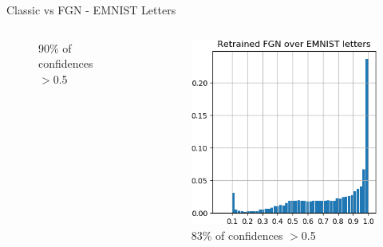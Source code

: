\documentclass{beamer}
\begin{document}
\begin{frame}{Classic vs FGN - EMNIST Letters }
\begin{columns}
\begin{column}{.33\textwidth}
\begin{figure}
        \centering \tiny{90\% of confidences $>$0.5}
    \end{figure}
    \end{column}
    \begin{column}{.33\textwidth}
    \begin{figure}
        \includegraphics[width=.85\textwidth]{images/mnist-behavior/retrained-hist-emnist.png}\\
        \centering \tiny{83\% of confidences $>$0.5}
    \end{figure}
    \end{column}
    \end{columns}
    

\end{frame}
\end{document}
